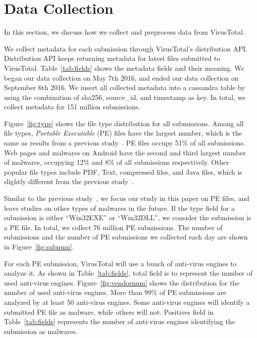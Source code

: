 \section{Data Collection}
\label{sec:label}


In this section, we discuss how we collect and preprocess data from VirusTotal. 





We collect metadata for each submission through VirusTotal’s distribution API. 
Distribution API keeps returning metadata for latest files submitted to VirusTotal.
Table~\ref{tab:fields} shows the metadata fields and their meaning.  
We began our data collection on May 7th 2016, 
and ended our data collection on September 6th 2016. 
We insert all collected metadata into a cassandra table by using the combination of sha256, source\_id, and timestamp as key.
In total, we collect metadata for 151 million submissions. 

Figure~\ref{fig:type} shows the file type distribution for all submissions. 
Among all file types, \textit{Portable Executable} (PE) files have the largest number, which is the same as results from a previous study~\cite{SongAPsys2016}.
PE files occupy 51\% of all submissions. 
Web pages and malwares on Android have the second and third largest number of malwares, 
occupying 12\% and 8\% of all submissions respectively. 
Other popular file types include PDF, Text, compressed files, and Java files, which is slightly different from the previous study~\cite{SongAPsys2016}. 

Similar to the previous study~\cite{SongAPsys2016}, 
we focus our study in this paper on PE files, 
and leave studies on other types of malwares in the future. 
If the type field for a submission is either ``Win32EXE'' or ``Win32DLL'', 
we consider the submission is a PE file. 
In total, we collect 76 million PE submissions. 
The number of submissions and the number of PE submissions we collected each day are shown in Figure~\ref{fig:subnum}. 





For each PE submission, VirusTotal will use a bunch of anti-virus engines to analyze it.
As shown in Table~\ref{tab:fields}, 
total field is to represent the number of used anti-virus engines. 
Figure~\ref{fig:vendornum} shows the distribution for the number of used anti-virus engines. 
More than 99\% of PE submissions are analyzed by at least 50 anti-virus engines. 
Some anti-virus engines will identify a submitted PE file as malware, while others will not. 
Positives field in Table~\ref{tab:fields} represents the number of anti-virus engines identifying the submission as malwares. 

